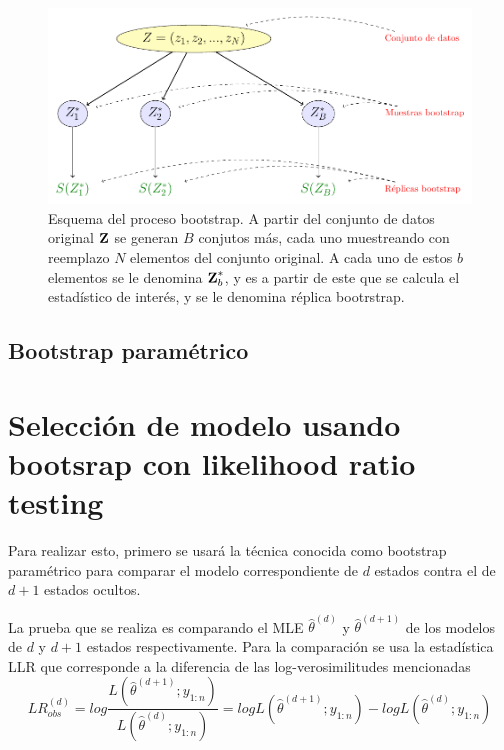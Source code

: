 \begin{figure}[hbt]
  \centerline
  {\includegraphics[width=1.1\linewidth]{gfx/chap4/untitled}}        
  \caption{Esquema del proceso bootstrap. A partir del conjunto de datos original $\textbf{Z}$ se generan $B$ conjutos más, cada uno muestreando con reemplazo $N$ elementos del conjunto original. A cada uno de estos $b$ elementos se le denomina $\textbf{Z}^{*}_b$, y es a partir de este que se calcula el estadístico de interés, y se le denomina réplica bootrstrap.}
  \label{fig:bootesq}
\end{figure}

%

\subsection{Bootstrap paramétrico}

\section{Selección de modelo usando bootsrap con likelihood ratio testing}

Para realizar esto, primero se usará la técnica conocida como bootstrap paramétrico para comparar el modelo correspondiente de $d$ estados contra el de $d+1$ estados ocultos.

La prueba que se realiza es comparando el \ac{MLE} $\hat \theta^{(d)}$ y $\hat \theta^{(d+1)}$ de los modelos de $d$ y $d+1$ estados respectivamente. Para la comparación se usa la estadística \ac{LLR} que corresponde a la diferencia de las log-verosimilitudes mencionadas
\begin{equation}
  LR^{(d)}_{obs} = log \frac{L(\hat \theta^{(d+1)}; y_{1:n})}{L(\hat \theta^{(d)}; y_{1:n})} =
    log L(\hat \theta^{(d+1)}; y_{1:n}) - 
    log L(\hat \theta^{(d)}; y_{1:n})
\end{equation}

